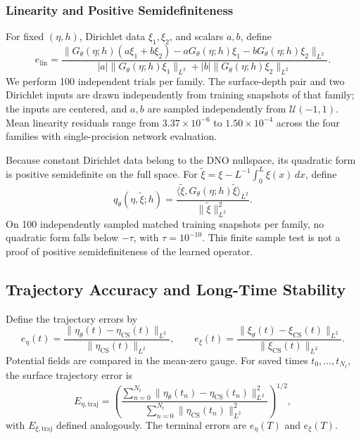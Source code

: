 \documentclass{article}
\begin{document}
\subsubsection{Linearity and Positive Semidefiniteness}
For fixed $(\eta,h)$, Dirichlet data $\xi_1,\xi_2$, and scalars $a,b$, define
\begin{equation}
e_{\mathrm{lin}}=
\frac{\|G_\theta(\eta;h)(a\xi_1+b\xi_2)
       -aG_\theta(\eta;h)\xi_1-bG_\theta(\eta;h)\xi_2\|_{L^2}}
     {|a|\|G_\theta(\eta;h)\xi_1\|_{L^2}
       +|b|\|G_\theta(\eta;h)\xi_2\|_{L^2}}.
\label{eq:linearity-residual}
\end{equation}
We perform 100 independent trials per family. The surface-depth pair and
two Dirichlet inputs are drawn independently from training snapshots of
that family; the inputs are centered, and $a,b$ are sampled independently
from $\mathcal U(-1,1)$. Mean linearity residuals range from
$3.37\times10^{-6}$ to $1.50\times10^{-4}$ across the four families with
single-precision network evaluation.

Because constant Dirichlet data belong to the DNO nullspace, its quadratic
form is positive semidefinite on the full space. For
$\widetilde\xi=\xi-L^{-1}\int_0^L\xi(x)\,dx$, define
\begin{equation}
q_\theta(\eta,\widetilde\xi;h)=
\frac{\langle\widetilde\xi,G_\theta(\eta;h)\widetilde\xi\rangle_{L^2}}
     {\|\widetilde\xi\|_{L^2}^2}.
\label{eq:positivity-statistic}
\end{equation}
On 100 independently sampled matched training snapshots per family, no
quadratic form falls below $-\tau$, with $\tau=10^{-10}$. This finite
sample test is not a proof of positive semidefiniteness of the learned
operator.

\subsection{Trajectory Accuracy and Long-Time Stability}
\label{sec:TrajectoryAccuracy}
Define the trajectory errors by
\begin{equation}
e_\eta(t)=\frac{\|\eta_\theta(t)-\eta_{\mathrm{CS}}(t)\|_{L^2}}
                   {\|\eta_{\mathrm{CS}}(t)\|_{L^2}},\qquad
e_\xi(t)=\frac{\|\xi_\theta(t)-\xi_{\mathrm{CS}}(t)\|_{L^2}}
                 {\|\xi_{\mathrm{CS}}(t)\|_{L^2}}.
\label{eq:state-relative-errors}
\end{equation}
Potential fields are compared in the mean-zero gauge. For saved times
$t_0,\ldots,t_{N_t}$, the surface trajectory error is
\begin{equation}
E_{\eta,\mathrm{traj}}=
\left(\frac{\sum_{n=0}^{N_t}\|\eta_\theta(t_n)-\eta_{\mathrm{CS}}(t_n)\|_{L^2}^2}
{\sum_{n=0}^{N_t}\|\eta_{\mathrm{CS}}(t_n)\|_{L^2}^2}\right)^{1/2},
\label{eq:eta-trajectory-error}
\end{equation}
with $E_{\xi,\mathrm{traj}}$ defined analogously. The terminal errors are
$e_\eta(T)$ and $e_\xi(T)$.
\end{document}
